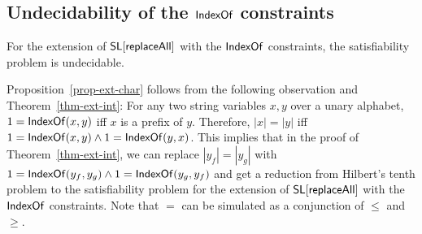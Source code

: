 %
%
%
%
%
%
%

\subsection{Undecidability of the $\mathsf{IndexOf}$ constraints}
 
 \begin{proposition}\label{prop-indexof}
	For the extension of $\mathsf{SL}[\mathsf{replaceAll}]$ with the $\mathsf{IndexOf}$ constraints, the satisfiability problem is undecidable. 
\end{proposition}

Proposition~\ref{prop-ext-char} follows from the following observation and Theorem~\ref{thm-ext-int}: For any two string variables $x,y$ over a unary alphabet, 
$1= \mathsf{IndexOf}(x,y)$ iff $x$ is a prefix of $y$. Therefore, $|x| = |y|$ iff $1=  \mathsf{IndexOf}(x,y) \wedge 1= \mathsf{IndexOf}(y,x)$. This implies that in the proof of Theorem~\ref{thm-ext-int}, we can replace $|y_f| = |y_g|$ with $1=\mathsf{IndexOf}(y_f, y_g) \wedge 1 = \mathsf{IndexOf}(y_g, y_f)$ and get a reduction from Hilbert's tenth problem to the satisfiability problem for the extension of $\mathsf{SL}[\mathsf{replaceAll}]$ with the $\mathsf{IndexOf}$ constraints.
Note that $=$ can be simulated as a conjunction of $\leq$ and $\geq$.


%



